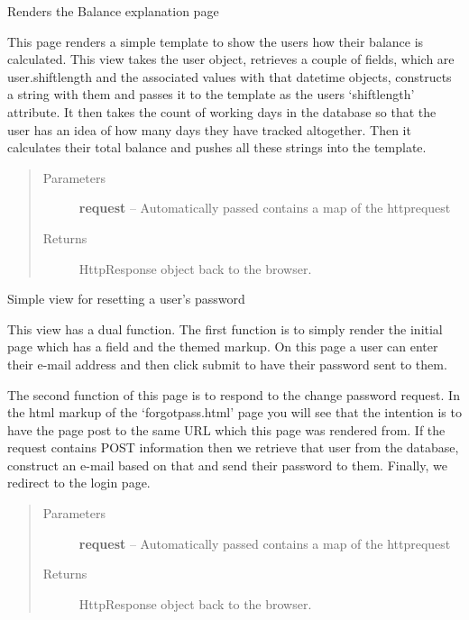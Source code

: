\documentclass[letterpaper,10pt,english]{sphinxmanual}
\begin{document}
\begin{fulllineitems}
\label{timetracker:timetracker.views.explain}
Renders the Balance explanation page

This page renders a simple template to show the users how their balance is
calculated. This view takes the user object, retrieves a couple of fields,
which are user.shiftlength and the associated values with that datetime
objects, constructs a string with them and passes it to the template as
the users `shiftlength' attribute. It then takes the count of working
days in the database so that the user has an idea of how many days they
have tracked altogether. Then it calculates their total balance and pushes
all these strings into the template.
\begin{quote}\begin{description}
\item[{Parameters}] \leavevmode
\textbf{request} -- Automatically passed contains a map of the httprequest

\item[{Returns}] \leavevmode
HttpResponse object back to the browser.

\end{description}\end{quote}

\end{fulllineitems}


\begin{fulllineitems}
\label{timetracker:timetracker.views.forgot_pass}
Simple view for resetting a user's password

This view has a dual function. The first function is to simply render the
initial page which has a field and the themed markup. On this page a user
can enter their e-mail address and then click submit to have their
password sent to them.

The second function of this page is to respond to the change password
request. In the html markup of the `forgotpass.html' page you will see
that the intention is to have the page post to the same URL which this
page was rendered from. If the request contains POST information then we
retrieve that user from the database, construct an e-mail based on that
and send their password to them. Finally, we redirect to the login page.
\begin{quote}\begin{description}
\item[{Parameters}] \leavevmode
\textbf{request} -- Automatically passed contains a map of the httprequest

\item[{Returns}] \leavevmode
HttpResponse object back to the browser.

\end{description}\end{quote}

\end{fulllineitems}
\end{document}
